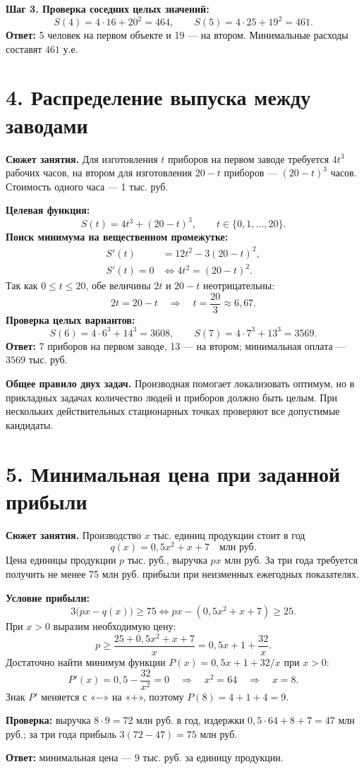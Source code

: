 \documentclass[a4paper,11pt]{article}
\newcommand{\topic}[1]{\Needspace{5\baselineskip}\section*{\color{darkaccent}#1}\vspace{-2mm}}
\newcommand{\key}[1]{\textcolor{darkaccent}{\textbf{#1}}}
\begin{document}
\textbf{Шаг 3. Проверка соседних целых значений:}
\[
S(4)=4\cdot16+20^2=464,
\qquad S(5)=4\cdot25+19^2=461.
\]
\key{Ответ:} 5 человек на первом объекте и 19 — на втором. Минимальные расходы составят $461$ у.е.

\topic{4. Распределение выпуска между заводами}
\key{Сюжет занятия.} Для изготовления $t$ приборов на первом заводе требуется $4t^3$ рабочих часов, на втором для изготовления $20-t$ приборов — $(20-t)^3$ часов. Стоимость одного часа — 1 тыс. руб.

\textbf{Целевая функция:}
\[
S(t)=4t^3+(20-t)^3,
\qquad t\in\{0,1,\ldots,20\}.
\]
\clearpage
\textbf{Поиск минимума на вещественном промежутке:}
\begin{align*}
S'(t)&=12t^2-3(20-t)^2,\\
S'(t)=0 &\iff 4t^2=(20-t)^2.
\end{align*}
Так как $0\le t\le20$, обе величины $2t$ и $20-t$ неотрицательны:
\[
2t=20-t\quad\Longrightarrow\quad t=\frac{20}{3}\approx6{,}67.
\]
\textbf{Проверка целых вариантов:}
\[
S(6)=4\cdot6^3+14^3=3608,
\qquad S(7)=4\cdot7^3+13^3=3569.
\]
\key{Ответ:} 7 приборов на первом заводе, 13 — на втором; минимальная оплата — $3569$ тыс. руб.

\key{Общее правило двух задач.} Производная помогает локализовать оптимум, но в прикладных задачах количество людей и приборов должно быть целым. При нескольких действительных стационарных точках проверяют все допустимые кандидаты.

\topic{5. Минимальная цена при заданной прибыли}
\key{Сюжет занятия.} Производство $x$ тыс. единиц продукции стоит в год
\[
q(x)=0{,}5x^2+x+7\quad\text{млн руб.}
\]
Цена единицы продукции $p$ тыс. руб., выручка $px$ млн руб. За три года требуется получить не менее 75 млн руб. прибыли при неизменных ежегодных показателях.

\textbf{Условие прибыли:}
\[
3\bigl(px-q(x)\bigr)\ge75
\iff px-(0{,}5x^2+x+7)\ge25.
\]
При $x>0$ выразим необходимую цену:
\[
p\ge\frac{25+0{,}5x^2+x+7}{x}
=0{,}5x+1+\frac{32}{x}.
\]
Достаточно найти минимум функции $P(x)=0{,}5x+1+32/x$ при $x>0$:
\[
P'(x)=0{,}5-\frac{32}{x^2}=0
\quad\Longrightarrow\quad x^2=64\quad\Longrightarrow\quad x=8.
\]
Знак $P'$ меняется с «$-$» на «$+$», поэтому $P(8)=4+1+4=9$.

\key{Проверка:} выручка $8\cdot9=72$ млн руб. в год, издержки $0{,}5\cdot64+8+7=47$ млн руб.; за три года прибыль $3(72-47)=75$ млн руб.

\key{Ответ:} минимальная цена — $9$ тыс. руб. за единицу продукции.
\clearpage
\end{document}
